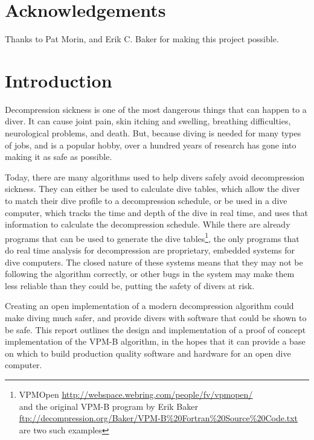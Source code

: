\documentclass[12pt]{article}
\begin{document}
\newpage

\section*{Acknowledgements}
Thanks to Pat Morin, and Erik C. Baker for making this project possible.

\newpage

\setcounter{tocdepth}{3}
\tableofcontents
\listofalgorithms

\newpage

\section{Introduction}

 Decompression sickness is one of the most dangerous things that can happen to a diver. It can cause joint pain,
 skin itching and swelling, breathing difficulties, neurological problems, and death. But, because diving
 is needed for many types of jobs, and is a popular hobby, over a hundred years of research has gone into making
 it as safe as possible\cite{haldane07}.

 Today, there are many algorithms used to help divers safely avoid decompression sickness. They can either be
 used to calculate dive tables, which allow the diver to match their dive profile to a decompression schedule,
 or be used in a dive computer, which tracks the time and depth of the dive in real time, and uses that information
 to calculate the decompression schedule. While there are already programs that can be used to generate the
 dive tables\footnote{VPMOpen {\color{blue}\uline{\href{http://webspace.webring.com/people/fv/vpmopen/}{http://webspace.webring.com/people/fv/vpmopen/}}}\\ and the original VPM-B program by Erik Baker \\{\color{blue}\uline{\href{ftp://decompression.org/Baker/VPM-B\%20Fortran\%20Source\%20Code.txt}{ftp://decompression.org/Baker/VPM-B\%20Fortran\%20Source\%20Code.txt}}} are two such examples}, the only programs that do real time analysis for decompression are proprietary,
embedded systems for dive computers. The closed nature of these systems means that they may not be following
the algorithm correctly, or other bugs in the system may make them less reliable than they could be, putting
the safety of divers at risk.

Creating an open implementation of a modern decompression algorithm could make diving much safer, and
provide divers with software that could be shown to be safe. This report outlines the design and implementation
of a proof of concept implementation of the VPM-B algorithm, in the hopes that it can provide a base on
which to build production quality software and hardware for an open dive computer.
\end{document}
